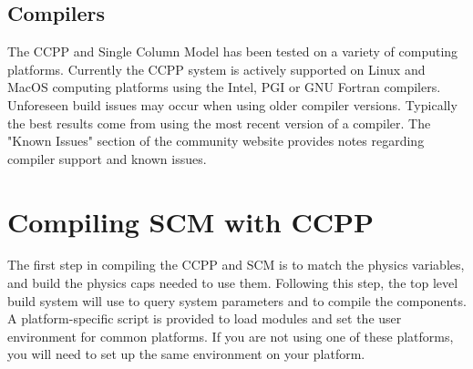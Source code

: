 \subsection{Compilers}
The CCPP and Single Column Model  has been tested on a variety of
computing platforms. Currently the CCPP system is actively supported
on Linux and MacOS computing platforms using the Intel, PGI or GNU Fortran
compilers. Unforeseen build issues may occur when using older
compiler versions. Typically the best results come from using the
most recent version of a compiler. The "Known Issues" section of the
community website provides notes regarding compiler support and known issues.


\section{Compiling SCM with CCPP}

The first step in compiling the CCPP and SCM is to match the physics variables, and build the physics caps needed to use them.  Following this step, the top level build system will use  to query system parameters and  to compile the components.  A platform-specific script is provided to load modules and set the user environment for common platforms.  If you are not using one of these platforms, you will need to set up the same environment on your platform.


